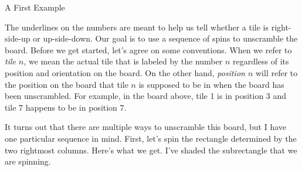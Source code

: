 \begin{section}{A First Example}
\begin{center}
\end{center}

\noindent The underlines on the numbers are meant to help us tell whether a tile is right-side-up or up-side-down.  Our goal is to use a sequence of spins to unscramble the board.  Before we get started, let's agree on some conventions.  When we refer to \emph{tile $n$}, we mean the actual tile that is labeled by the number $n$ regardless of its position and orientation on the board.  On the other hand, \emph{position $n$} will refer to the position on the board that tile $n$ is supposed to be in when the board has been unscrambled.  For example, in the board above, tile 1 is in position 3 and tile 7 happens to be in position 7.  

It turns out that there are multiple ways to unscramble this board, but I have one particular sequence in mind.  First, let's spin the rectangle determined by the two rightmost columns.  Here's what we get.  I've shaded the subrectangle that we are spinning.


\end{section}
